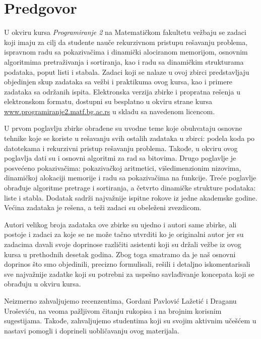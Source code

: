 
\chapter*{Predgovor}

U okviru kursa {\em Programiranje 2} na Matematičkom fakultetu vežbaju se zadaci 
koji imaju za cilj da studente nauče rekurzivnom pristupu rešavanju problema, 
ispravnom radu sa pokazivačima i dinamički alociranom memorijom, osnovnim algoritmima 
pretraživanja i sortiranja, kao i radu sa dinamičkim strukturama podataka, 
poput listi i stabala. Zadaci koji se nalaze u ovoj zbirci predstavljaju 
objedinjen skup zadataka sa vežbi i praktikuma ovog kursa, kao i primere 
zadataka sa održanih ispita. 
Elektronska verzija zbirke i propratna rešenja u elektronskom formatu, dostupni su 
besplatno u okviru strane kursa \url{www.programiranje2.matf.bg.ac.rs} u skladu sa navedenom licencom.


U prvom poglavlju zbirke obrađene su uvodne teme koje obuhvataju osnovne tehnike koje se koriste u rešavanju svih ostalih zadataka u zbirci: podela koda po datotekama i rekurzivni pristup rešavanju problema. Takođe, u okviru ovog poglavlja dati su i osnovni algoritmi za rad sa bitovima. Drugo poglavlje je posvećeno pokazivačima: pokazivačkoj aritmetici, višedimenzionim nizovima, dinamičkoj alokaciji memorije i radu sa pokazivačima na funkcije. Treće poglavlje obrađuje algoritme pretrage i sortiranja, a četvrto dinamičke strukture podataka: liste i stabla. Dodatak sadrži najvažnije ispitne rokove iz jedne akademske godine. Većina zadataka je rešena, a teži zadaci su obeleženi zvezdicom.


Autori velikog broja zadataka ove zbirke su ujedno i autori same zbirke, ali postoje 
i zadaci za koje se ne može tačno utvrditi ko je originalni autor jer su zadacima 
davali svoje doprinose različiti asistenti koji su držali vežbe iz ovog kursa u 
prethodnih desetak godina. Zbog toga smatramo da je naš osnovni doprinos 
što smo objedinili, precizno formulisali, rešili i detaljno iskomentarisali 
sve najvažnije zadatke koji su potrebni za uspešno savlađivanje koncepata 
koji se obrađuju u okviru kursa. 

\newpage
Neizmerno zahvaljujemo recenzentima, Gordani Pavlović Lažetić i Draganu Uroševiću, na veoma pažljivom čitanju rukopisa i na brojnim korisnim sugestijama. Takođe, zahvaljujemo studentima koji su svojim aktivnim učešćem u nastavi pomogli i doprineli uobličavanju ovog materijala. 

